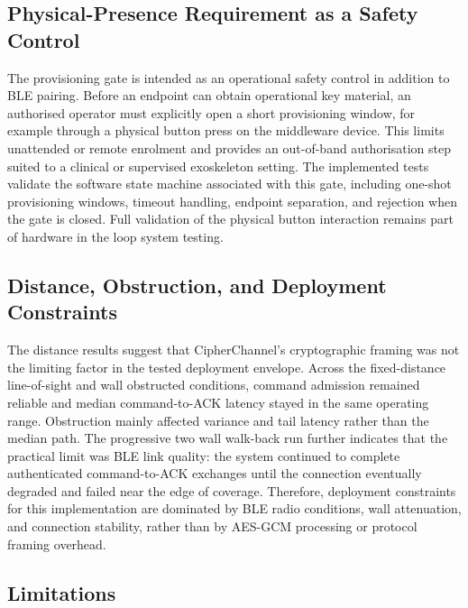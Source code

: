 \documentclass[journal]{IEEEtran}
\begin{document}
\subsection{Physical-Presence Requirement as a Safety Control}

The provisioning gate is intended as an operational safety control in addition to BLE pairing. Before an endpoint can obtain operational key material, an authorised operator must explicitly open a short provisioning window, for example through a physical button press on the middleware device. This limits unattended or remote enrolment and provides an out-of-band authorisation step suited to a clinical or supervised exoskeleton setting. The implemented tests validate the software state machine associated with this gate, including one-shot provisioning windows, timeout handling, endpoint separation, and rejection when the gate is closed. Full validation of the physical button interaction remains part of hardware in the loop system testing.

\subsection{Distance, Obstruction, and Deployment Constraints}
The distance results suggest that CipherChannel's cryptographic framing was not the limiting factor in the tested deployment envelope. Across the fixed-distance line-of-sight and wall obstructed conditions, command admission remained reliable and median command-to-ACK latency stayed in the same operating range. Obstruction mainly affected variance and tail latency rather than the median path. The progressive two wall walk-back run further indicates that the practical limit was BLE link quality: the system continued to complete authenticated command-to-ACK exchanges until the connection eventually degraded and failed near the edge of coverage. Therefore, deployment constraints for this implementation are dominated by BLE radio conditions, wall attenuation, and connection stability, rather than by AES-GCM processing or protocol framing overhead.

\subsection{Limitations}
\label{sec:limitations}
\end{document}
